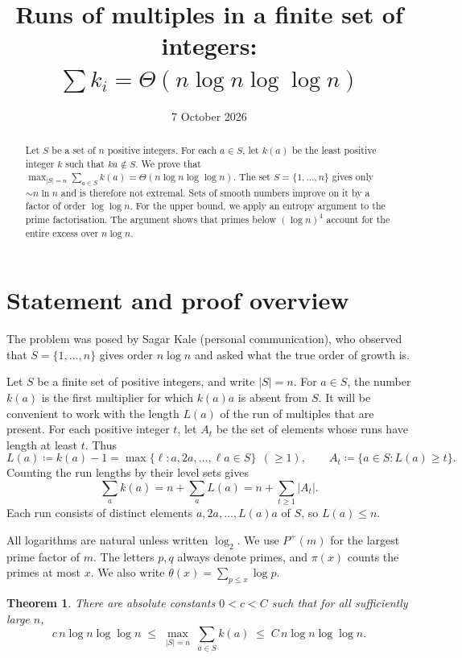 \documentclass[11pt]{article}
\title{Runs of multiples in a finite set of integers:\\[2pt] $\sum k_i = \Theta(n \log n \log\log n)$}
\author{}
\date{7 October 2026}
\newtheorem{theorem}{Theorem}
\theoremstyle{remark}
\newcommand{\Pplus}{P^{+}}
\begin{document}
\maketitle

\begin{abstract}
Let $S$ be a set of $n$ positive integers.
For each $a\in S$, let $k(a)$ be the least positive integer $k$ such that $ka\notin S$.
We prove that $\max_{|S|=n}\sum_{a\in S}k(a) = \Theta(n\log n\log\log n)$.
The set $S=\{1,\dots,n\}$ gives only $\sim n\ln n$ and is therefore not extremal.
Sets of smooth numbers improve on it by a factor of order $\log\log n$.
For the upper bound, we apply an entropy argument to the prime factorisation.
The argument shows that primes below $(\log n)^4$ account for the entire excess over $n\log n$.
\end{abstract}

\section{Statement and proof overview}

The problem was posed by Sagar Kale (personal communication), who observed that $S=\{1,\dots,n\}$ gives order $n\log n$ and asked what the true order of growth is.

Let $S$ be a finite set of positive integers, and write $|S|=n$.
For $a\in S$, the number $k(a)$ is the first multiplier for which $k(a)a$ is absent from $S$.
It will be convenient to work with the length $L(a)$ of the run of multiples that are present.
For each positive integer $t$, let $A_t$ be the set of elements whose runs have length at least $t$.
Thus
\[
  L(a) \coloneqq k(a)-1 = \max\{\ell : a,2a,\dots,\ell a\in S\} \ \ (\ge 1),
  \qquad
  A_t \coloneqq \{a\in S : L(a)\ge t\}.
\]
Counting the run lengths by their level sets gives
\[
  \sum_{a}k(a) = n+\sum_a L(a) = n + \sum_{t\ge1}|A_t|.
\]
Each run consists of distinct elements $a,2a,\dots,L(a)a$ of $S$, so $L(a)\le n$.

All logarithms are natural unless written $\log_2$.
We use $\Pplus(m)$ for the largest prime factor of $m$.
The letters $p,q$ always denote primes, and $\pi(x)$ counts the primes at most $x$.
We also write $\theta(x)=\sum_{p\le x}\log p$.

\begin{theorem}\label{thm:main}
There are absolute constants $0<c<C$ such that for all sufficiently large $n$,
\[
  c\, n\log n\log\log n \;\le\; \max_{|S|=n}\ \sum_{a\in S}k(a) \;\le\; C\, n\log n\log\log n .
\]
\end{theorem}
\end{document}
